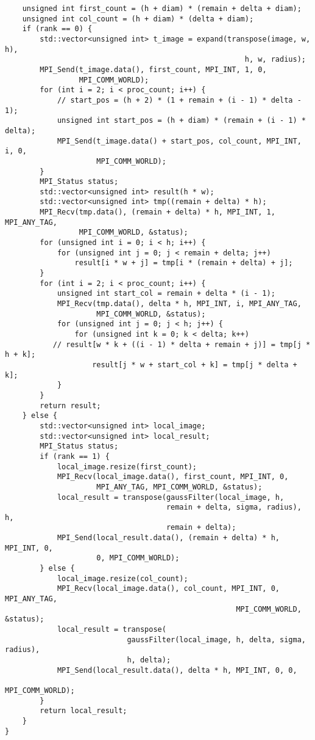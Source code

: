 \documentclass{report}
\begin{document}
\begin{lstlisting}
    unsigned int first_count = (h + diam) * (remain + delta + diam);
    unsigned int col_count = (h + diam) * (delta + diam);
    if (rank == 0) {
        std::vector<unsigned int> t_image = expand(transpose(image, w, h),
                                                       h, w, radius);
        MPI_Send(t_image.data(), first_count, MPI_INT, 1, 0,
                 MPI_COMM_WORLD);
        for (int i = 2; i < proc_count; i++) {
            // start_pos = (h + 2) * (1 + remain + (i - 1) * delta - 1);
            unsigned int start_pos = (h + diam) * (remain + (i - 1) * delta);
            MPI_Send(t_image.data() + start_pos, col_count, MPI_INT, i, 0,
                     MPI_COMM_WORLD);
        }
        MPI_Status status;
        std::vector<unsigned int> result(h * w);
        std::vector<unsigned int> tmp((remain + delta) * h);
        MPI_Recv(tmp.data(), (remain + delta) * h, MPI_INT, 1, MPI_ANY_TAG,
                 MPI_COMM_WORLD, &status);
        for (unsigned int i = 0; i < h; i++) {
            for (unsigned int j = 0; j < remain + delta; j++)
                result[i * w + j] = tmp[i * (remain + delta) + j];
        }
        for (int i = 2; i < proc_count; i++) {
            unsigned int start_col = remain + delta * (i - 1);
            MPI_Recv(tmp.data(), delta * h, MPI_INT, i, MPI_ANY_TAG,
                     MPI_COMM_WORLD, &status);
            for (unsigned int j = 0; j < h; j++) {
                for (unsigned int k = 0; k < delta; k++)
           // result[w * k + ((i - 1) * delta + remain + j)] = tmp[j * h + k];
                    result[j * w + start_col + k] = tmp[j * delta + k];
            }
        }
        return result;
    } else {
        std::vector<unsigned int> local_image;
        std::vector<unsigned int> local_result;
        MPI_Status status;
        if (rank == 1) {
            local_image.resize(first_count);
            MPI_Recv(local_image.data(), first_count, MPI_INT, 0,
                     MPI_ANY_TAG, MPI_COMM_WORLD, &status);
            local_result = transpose(gaussFilter(local_image, h,
                                     remain + delta, sigma, radius), h,
                                     remain + delta);
            MPI_Send(local_result.data(), (remain + delta) * h, MPI_INT, 0,
                     0, MPI_COMM_WORLD);
        } else {
            local_image.resize(col_count);
            MPI_Recv(local_image.data(), col_count, MPI_INT, 0, MPI_ANY_TAG,
                                                     MPI_COMM_WORLD, &status);
            local_result = transpose(
                            gaussFilter(local_image, h, delta, sigma, radius),
                            h, delta);
            MPI_Send(local_result.data(), delta * h, MPI_INT, 0, 0,
                                                       MPI_COMM_WORLD);
        }
        return local_result;
    }
}
\end{lstlisting}
\end{document}
